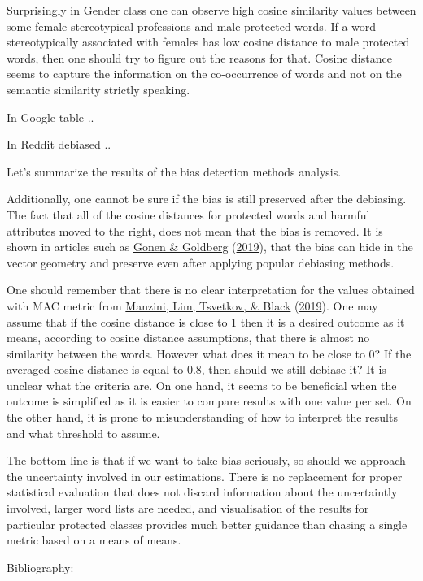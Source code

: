 \documentclass[
  12pt,
]{book}
\begin{document}
Surprisingly in Gender class one can observe high cosine similarity values between some female stereotypical professions and male protected words. If a word stereotypically associated with females has low cosine distance to male protected words, then one should try to figure out the reasons for that. Cosine distance seems to capture the information on the co-occurrence of words and not on the semantic similarity strictly speaking.

In Google table ..

In Reddit debiased ..

Let's summarize the results of the bias detection methods analysis.

Additionally, one cannot be sure if the bias is still preserved after the debiasing. The fact that all of the cosine distances for protected words and harmful attributes moved to the right, does not mean that the bias is removed. It is shown in articles such as \protect\hyperlink{ref-Gonen2019Lipstick}{Gonen \& Goldberg} (\protect\hyperlink{ref-Gonen2019Lipstick}{2019}), that the bias can hide in the vector geometry and preserve even after applying popular debiasing methods.

One should remember that there is no clear interpretation for the values obtained with MAC metric from \protect\hyperlink{ref-Manzini2019blackToCriminal}{Manzini, Lim, Tsvetkov, \& Black} (\protect\hyperlink{ref-Manzini2019blackToCriminal}{2019}). One may assume that if the cosine distance is close to 1 then it is a desired outcome as it means, according to cosine distance assumptions, that there is almost no similarity between the words. However what does it mean to be close to 0? If the averaged cosine distance is equal to 0.8, then should we still debiase it? It is unclear what the criteria are. On one hand, it seems to be beneficial when the outcome is simplified as it is easier to compare results with one value per set. On the other hand, it is prone to misunderstanding of how to interpret the results and what threshold to assume.

The bottom line is that if we want to take bias seriously, so should we approach the uncertainty involved in our estimations. There is no replacement for proper statistical evaluation that does not discard information about the uncertaintly involved, larger word lists are needed, and visualisation of the results for particular protected classes provides much better guidance than chasing a single metric based on a means of means.

Bibliography:
\end{document}
